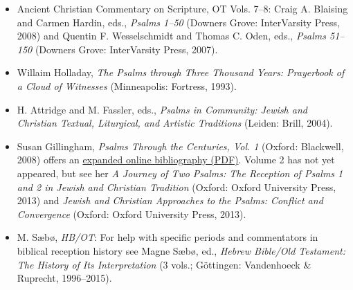 \documentclass[titlepage]{article}
\begin{document}
\begin{itemize}

	\item Ancient Christian Commentary on Scripture, OT Vols. 7--8:
	  Craig A. Blaising and Carmen Hardin, eds., \emph{Psalms 1--50} (Downers Grove: InterVarsity Press, 2008) and
	  Quentin F. Wesselschmidt and Thomas C. Oden, eds., \emph{Psalms 51--150} (Downers Grove: InterVarsity Press, 2007).

	\item Willaim Holladay, \emph{The Psalms through Three Thousand Years: Prayerbook of a Cloud of Witnesses} (Minneapolis: Fortress, 1993).

	\item H. Attridge and M. Fassler, eds., \emph{Psalms in Community: Jewish and Christian Textual, Liturgical, and Artistic Traditions} (Leiden: Brill, 2004).

	\item Susan Gillingham, \emph{Psalms Through the Centuries, Vol. 1} (Oxford: Blackwell, 2008) offers an \href{http://www.blackwellpublishing.com/pdf/9780631218555.pdf}{expanded online bibliography (PDF)}. Volume 2 has not yet appeared, but see her \emph{A Journey of Two Psalms: The Reception of Psalms 1 and 2 in Jewish and Christian Tradition} (Oxford: Oxford University Press, 2013) and \emph{Jewish and Christian Approaches to the Psalms: Conflict and Convergence} (Oxford: Oxford University Press, 2013).

	\item M. Sæbø, \emph{HB/OT}: For help with specific periods and commentators in biblical reception history see Magne Sæbø, ed., \emph{Hebrew Bible/Old Testament: The History of Its Interpretation} (3 vols.; Göttingen: Vandenhoeck \& Ruprecht, 1996--2015).

\end{itemize}
\end{document}
